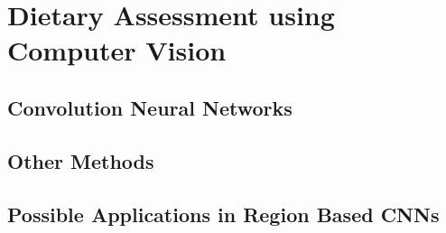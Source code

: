 \section{Dietary Assessment using Computer Vision}
\subsection*{Convolution Neural Networks}


\subsection*{Other Methods}


\subsection*{Possible Applications in Region Based CNNs}








